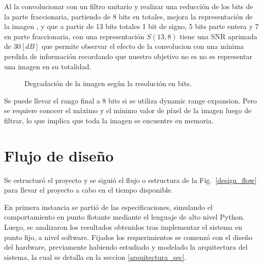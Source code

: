 Al la convolucionar con un filtro unitario y realizar una reducci\'on de los
bits de la parte fraccionaria, partiendo de 8 bits en totales, mejora la
representaci\'on de la imagen , y que a partir de 13 bits totales 1 bit de
signo, 5 bits parte entera y 7 en parte fraccionaria, con una representación
\(S(13,8)\) tiene una SNR aprimada de \(30 [dB]\) que permite observar el efecto
de la convolucion con una m\'inima perdida de informaci\'on recordando que
nuestro objetivo no es no es representar una imagen en su totalidad.

\begin{figure}[!t]
  \centering
    \hfil %
    \centering
      \caption{Degradación de la imagen según la resolución en bits.}
      \label{prepro2}
    \end{figure}

Se puede llevar el rango final a 8 bits si se utiliza dynamic range expansion.
Pero se requiere conocer el m\'aximo y el m\'inimo valor de p\'ixel de la imagen
luego de filtrar, lo que implica que toda la imagen se encuentre en memoria.

\section{Flujo de diseño} \label{flujo_subsecc}

Se estructuró el proyecto y se siguió el flujo o estructura de la
Fig.~\ref{design_flow} para llevar el proyecto a cabo en el tiempo disponible.

En primera instancia se partió de las especificaciones, simulando el comportamiento en punto flotante mediante el lenguaje de alto nivel Python. Luego, se analizaron los resultados obtenidos tras implementar el sistema en punto fijo, a nivel software. 
Fijados los requerimientos se comenzó con el diseño del hardware,
previamente habiendo estudiado y modelado la arquitectura del sistema, la cual
se detalla en la seccion \ref{arquitectura_sec}.

